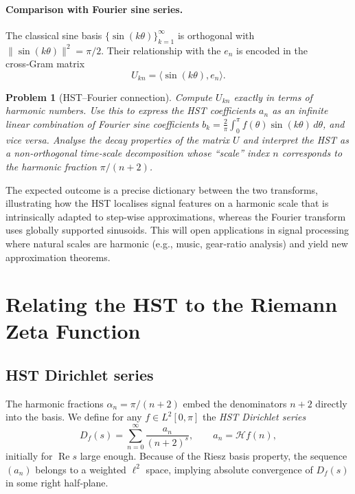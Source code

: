 \documentclass[11pt,a4paper]{article}
\newtheorem{problem}{Problem}[section]
\begin{document}
\paragraph{Comparison with Fourier sine series.}
The classical sine basis \(\{\sin(k\theta)\}_{k=1}^\infty\) is orthogonal with \(\|\sin(k\theta)\|^2 = \pi/2\). Their relationship with the \(e_n\) is encoded in the cross‑Gram matrix
\[
U_{k n} = \langle \sin(k\theta), e_n\rangle .
\]

\begin{problem}[HST–Fourier connection]
\label{prob:connect}
Compute \(U_{k n}\) exactly in terms of harmonic numbers. Use this to express the HST coefficients \(a_n\) as an infinite linear combination of Fourier sine coefficients \(b_k = \frac{2}{\pi}\int_0^\pi f(\theta) \sin(k\theta)\,d\theta\), and vice versa. Analyse the decay properties of the matrix \(U\) and interpret the HST as a \emph{non‑orthogonal time‑scale decomposition} whose “scale” index \(n\) corresponds to the harmonic fraction \(\pi/(n+2)\).
\end{problem}

The expected outcome is a precise dictionary between the two transforms, illustrating how the HST localises signal features on a harmonic scale that is intrinsically adapted to step‑wise approximations, whereas the Fourier transform uses globally supported sinusoids. This will open applications in signal processing where natural scales are harmonic (e.g., music, gear‑ratio analysis) and yield new approximation theorems.

\section{Relating the HST to the Riemann Zeta Function}

\subsection{HST Dirichlet series}

The harmonic fractions \(\alpha_n = \pi/(n+2)\) embed the denominators \(n+2\) directly into the basis. We define for any \(f\in L^2[0,\pi]\) the \emph{HST Dirichlet series}
\[
D_f(s) = \sum_{n=0}^\infty \frac{a_n}{(n+2)^s},\qquad a_n = \mathcal{H}f(n),
\]
initially for \(\operatorname{Re} s\) large enough. Because of the Riesz basis property, the sequence \((a_n)\) belongs to a weighted \(\ell^2\) space, implying absolute convergence of \(D_f(s)\) in some right half‑plane.
\end{document}
